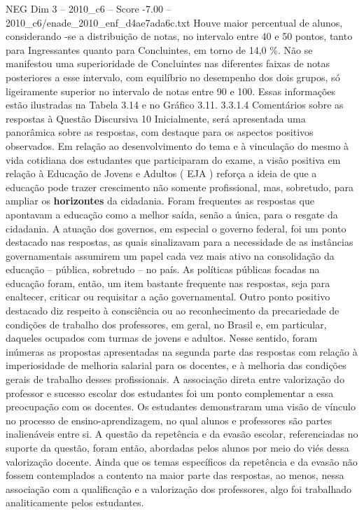 \begin{textsample}{NEG Dim 3 – 2010\_c6 – Score -7.00 – 2010\_c6/enade\_2010\_enf\_d4ae7ada6c.txt}
Houve maior percentual de alunos, considerando -se a distribuição de notas, no intervalo entre 40 e 50 pontos, tanto para Ingressantes quanto para Concluintes, em torno de 14,0 \%.
Não se manifestou uma superioridade de Concluintes nas diferentes faixas de notas posteriores a esse intervalo, com equilíbrio no desempenho dos dois grupos, só ligeiramente superior no intervalo de notas entre 90 e 100.
Essas informações estão ilustradas na Tabela 3.14 e no Gráfico 3.11. 3.3.1.4 Comentários sobre as respostas à Questão Discursiva 10 Inicialmente, será apresentada uma panorâmica sobre as respostas, com destaque para os aspectos positivos observados.
Em relação ao desenvolvimento do tema e à vinculação do mesmo à vida cotidiana dos estudantes que participaram do exame, a visão positiva em relação à Educação de Jovens e Adultos ( EJA ) reforça a ideia de que a educação pode trazer crescimento não somente profissional, mas, sobretudo, para ampliar os \textbf{horizontes} da cidadania.
Foram frequentes as respostas que apontavam a educação como a melhor saída, senão a única, para o resgate da cidadania.
A atuação dos governos, em especial o governo federal, foi um ponto destacado nas respostas, as quais sinalizavam para a necessidade de as instâncias governamentais assumirem um papel cada vez mais ativo na consolidação da educação – pública, sobretudo – no país.
As políticas públicas focadas na educação foram, então, um item bastante frequente nas respostas, seja para enaltecer, criticar ou requisitar a ação governamental.
Outro ponto positivo destacado diz respeito à consciência ou ao reconhecimento da precariedade de condições de trabalho dos professores, em geral, no Brasil e, em particular, daqueles ocupados com turmas de jovens e adultos.
Nesse sentido, foram inúmeras as propostas apresentadas na segunda parte das respostas com relação à imperiosidade de melhoria salarial para os docentes, e à melhoria das condições gerais de trabalho desses profissionais.
A associação direta entre valorização do professor e sucesso escolar dos estudantes foi um ponto complementar a essa preocupação com os docentes.
Os estudantes demonstraram uma visão de vínculo no processo de ensino-aprendizagem, no qual alunos e professores são partes inalienáveis entre si.
A questão da repetência e da evasão escolar, referenciadas no suporte da questão, foram então, abordadas pelos alunos por meio do viés dessa valorização docente.
Ainda que os temas específicos da repetência e da evasão não fossem contemplados a contento na maior parte das respostas, ao menos, nessa associação com a qualificação e a valorização dos professores, algo foi trabalhado analiticamente pelos estudantes.

\end{textsample}
